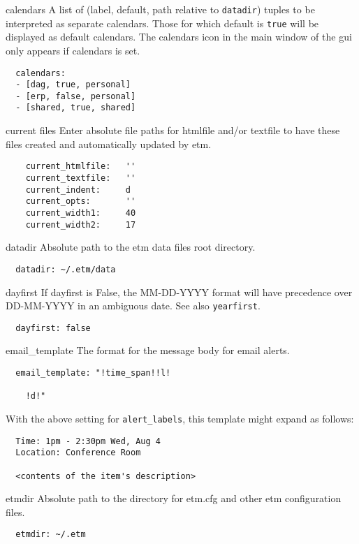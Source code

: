 \documentclass[9pt,landscape]{article}
\begin{document}
\begin{multicols}{3}
\begin{compactdesc}
\item[calendars] A list of (label, default, path relative to \verb!datadir!) tuples to be interpreted as separate calendars. Those for which default is \verb!true! will be displayed as default calendars. The calendars icon in the main window of the gui only appears if calendars is set.
\begin{verbatim}
  calendars:
  - [dag, true, personal]
  - [erp, false, personal]
  - [shared, true, shared]
\end{verbatim}

\item[current files] Enter absolute file paths for htmlfile and/or textfile to have these files created and automatically updated by etm.
\begin{verbatim}
    current_htmlfile:   ''
    current_textfile:   ''
    current_indent:     d
    current_opts:       ''
    current_width1:     40
    current_width2:     17
\end{verbatim}

\item[datadir] Absolute path to the etm data files root directory.
\begin{verbatim}
  datadir: ~/.etm/data
\end{verbatim}

\item[dayfirst] If dayfirst is False, the MM-DD-YYYY format will have precedence over DD-MM-YYYY in an ambiguous date. See also \verb!yearfirst!.
\begin{verbatim}
  dayfirst: false
\end{verbatim}

\item[email\_template] The format for the message body for email alerts.
\begin{verbatim}
  email_template: "!time_span!!l!

    !d!"
\end{verbatim}
With the above setting for \verb'alert_labels', this template might expand as follows:
\begin{verbatim}
  Time: 1pm - 2:30pm Wed, Aug 4
  Location: Conference Room

  <contents of the item's description>
\end{verbatim}

\item[etmdir] Absolute path to the directory for etm.cfg and other etm configuration files.
\begin{verbatim}
  etmdir: ~/.etm
\end{verbatim}


\end{compactdesc}
\end{multicols}
\end{document}
